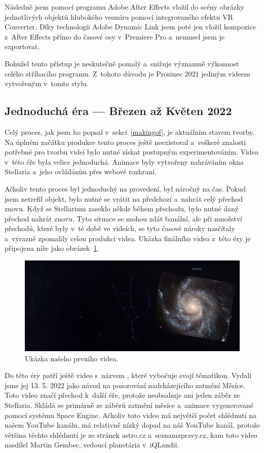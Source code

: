 \documentclass[12pt,a4paper,titlepage]{article}
\begin{document}
Následně jsem pomocí programu Adobe After Effects vložil do scény obrázky jednotlivých objektů hlubokého vesmíru pomocí integrovaného efektu VR Converter. Díky technologii Adobe Dynamic Link jsem poté jen vložil kompozice z~After Effects přímo do časové osy v~Premiere Pro a~nemusel jsem je exportovat. 

Bohužel tento přístup je neskutečně pomalý a~snižuje významně výkonnost celého stříhacího programu. Z~tohoto důvodu je Prosinec 2021 jediným videem vytvořeným v~tomto stylu.

\subsection{Jednoduchá éra --- Březen až Květen 2022}
Celý proces, jak jsem ho popsal v~sekci~\ref{makingof}, je aktuálním stavem tvorby. Na úplném začátku produkce tento proces ještě neexistoval a~veškeré znalosti potřebné pro tvorbu  videí bylo nutné získat postupným experimentováním. Videa v~této éře byla velice jednoduchá. Animace byly vytvořeny nahráváním okna Stellaria a~jeho ovládáním přes webové rozhraní.

Ačkoliv tento proces byl jednoduchý na provedení, byl náročný na čas. Pokud jsem netrefil objekt, bylo nutné se vrátit na předchozí a~nahrát celý přechod znovu. Když se Stellarium zaseklo někde během přechodu, bylo nutné daný přechod nahrát znovu. Tyto situace se mohou zdát banální, ale při množství přechodů, které byly v~té době ve videích, se tyto časové nároky nasčítaly a~výrazně zpomalily celou produkci videa. Ukázka finálního videa z~této éry je připojena níže jako obrázek~\ref{img:brezen}.

\begin{figure}[H]
	\centering
	\includegraphics[width=.85\textwidth]{brezen.png}
	\caption{Ukázka našeho prvního videa.}\label{img:brezen}
\end{figure}

Do této éry patří ještě video s~názvem , které vybočuje svojí tématikou. Vydali jsme jej 13. 5. 2022 jako návod na pozorování nadcházejícího zatmění Měsíce. Toto video značí přechod k~další éře, protože neobsahuje ani jeden záběr ze Stellaria. Skládá se primárně ze záběrů zatmění měsíce a~animace vygenerované pomocí systému Space Engine. Ačkoliv toto video má největší počet shlédnutí na našem YouTube kanálu, má relativně nízký dopad na náš YouTube kanál, protože většina těchto shlédnutí je ze stránek astro.cz a~seznamzpravy.cz, kam toto video nasdílel Martin Gembec, vedoucí planetária v~iQLandii.
\end{document}
